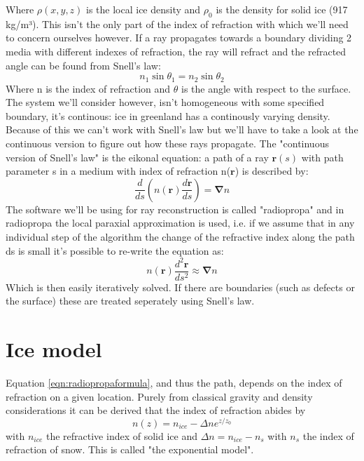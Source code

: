 \documentclass[11pt,a4paper,faculty=we,language=en,doctype=report]{cls/ugent-doc}
\begin{document}
Where $\rho(x,y,z)$ is the local ice density and $\rho_0$ is the
density for solid ice (917 kg/m³).
This isn't the only part of the index of refraction with which we'll
need to concern ourselves however. If a ray propagates towards a
boundary dividing 2 media with different indexes of refraction, the
ray will refract and the refracted angle can be
found from Snell's law:
\begin{equation}
	n_1\sin{\theta_1} = n_2\sin{\theta_2}
\end{equation}
Where n is the index of refraction and $\theta$ is the angle
with respect to the surface.
The system we'll consider however, isn't 
homogeneous with some specified boundary, it's continous: ice
in greenland has a continously varying density. 
Because of this we can't work with Snell's law but we'll have to 
take a look at the continuous version
to figure out how these rays propagate. 
The "continuous version of Snell's law" is the eikonal equation:
a path of a ray $\mathbf{r}(s)$ with path parameter s in a medium
with index of refraction n($\mathbf{r}$) is described by:
\begin{equation}
	\frac{d}{ds}\left(n(\mathbf{r})\frac{d\mathbf{r}}{ds}\right) = \mathbf{\nabla} n
\end{equation}
The software we'll be using for ray reconstruction is called
"radiopropa" \cite{Winchen_2019} and in radiopropa the
local paraxial approximation is used, i.e. if we assume that in any
individual step of the algorithm the change of the refractive index
along the path ds is small it's possible to
re-write the equation as:
\begin{equation}
	n(\mathbf{r})\frac{d^2\mathbf{r}}{ds^2} \approx \mathbf{\nabla} n
	\label{eqn:radiopropaformula}
\end{equation}
Which is then easily iteratively solved.
If there are boundaries (such as defects or the surface)
these are treated seperately using Snell's law. 
\section{Ice model}
Equation \ref{eqn:radiopropaformula}, and thus the path, depends 
on the index of refraction on a given location. 
Purely from classical gravity and density considerations
it can be derived that the index of refraction abides by
\begin{equation}
	n(z) = n_{ice} - \Delta n e^{z/z_0}
\end{equation}
with $n_{ice}$ the refractive index of solid ice and $\Delta n =
n_{ice} - n_s$ with $n_s$ the index of refraction of snow. This is
called
"the exponential model".
\end{document}
